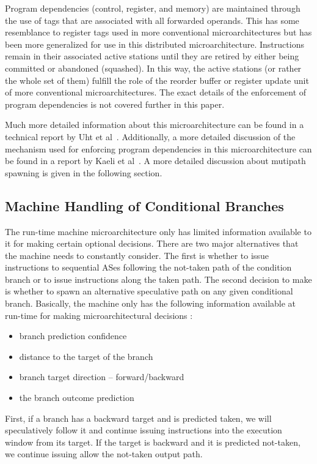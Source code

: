 \documentclass[10pt,dvips]{article}
\begin{document}
Program dependencies (control, register, and memory) are 
maintained through the use of tags that
are associated with all forwarded operands.
This has some resemblance to register tags used in more conventional 
microarchitectures but has been more generalized for use in this
distributed microarchitecture.  Instructions remain in their
associated active stations until they are retired by either being
committed or abandoned (squashed).  In this way, the active stations
(or rather the whole set of them)
fulfill the role of the reorder buffer or register update unit of more
conventional microarchitectures.
The exact details of the enforcement of program dependencies
is not covered further in this paper.

Much more detailed information about this microarchitecture
can be found in a technical report by Uht et al~\cite{Uht01}.
Additionally, a more detailed discussion of the mechanism used for
enforcing program dependencies in this microarchitecture
can be found in a report by Kaeli et al~\cite{Uht01}.
A more detailed discussion about mutipath spawning is given
in the following section.
%
\subsection{Machine Handling of Conditional Branches}
%
The run-time machine microarchitecture only has limited information
available to it for making certain optional decisions.
There are two major alternatives that the machine needs to constantly
consider.  The first is whether to issue instructions to sequential
ASes following
the not-taken path of the condition branch or to issue instructions
along the 
taken path.  
The second decision to make is
whether to spawn an alternative speculative path
on any given conditional branch.
Basically, the machine only has the following information
available at run-time for making microarchitectural decisions :

\begin{itemize}
\item{branch prediction confidence}
\item{distance to the target of the branch}
\item{branch target direction -- forward/backward}
\item{the branch outcome prediction}
\end{itemize}   

First, if a branch has a backward target and is predicted taken,
we will speculatively follow it and continue issuing instructions
into the execution window from its target.  If the target is backward
and it is predicted not-taken, we continue issuing allow the
not-taken output path.
\end{document}
